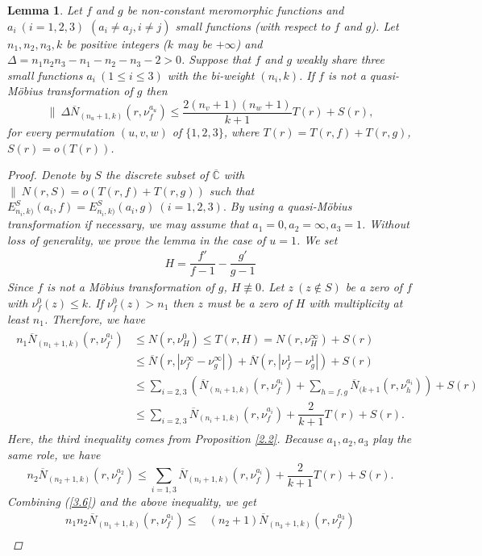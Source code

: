 \documentclass[10pt,a4paper]{amsart}
\newtheorem{lemma}{Lemma}
\newcommand{\C}{{\mathbb{C}}}
\begin{document}
\begin{lemma}\label{2.6}
Let $f$ and $g$ be non-constant meromorphic functions and $a_i\ (i=1,2,3)$ $ (a_i\ne a_j, i\ne j)$ small functions (with respect to $f$ and $g$). Let $n_1,n_2,n_3,k$ be positive integers ($k$ may be $+\infty$) and $\Delta=n_1n_2n_3-n_1-n_2-n_3-2>0$. Suppose that $f$ and $g$ weakly share three small functions $a_i\ (1\le i\le 3)$ with the bi-weight $(n_i,k)$. If $f$ is not a quasi-M\"{o}bius transformation of $g$ then
$$\|\ \Delta\overline N_{(n_u+1,k)}(r,\nu^{a_u}_f)\le \frac{2(n_v+1)(n_w+1)}{k+1}T(r)+S(r),$$
for every permutation $(u,v,w)$ of $\{1,2,3\}$, where $T(r)=T(r,f)+T(r,g)$, $S(r)=o(T(r))$.
\begin{proof}
Denote by $S$ the discrete subset of $\overline\C$ with $\|\ N(r,S)=o(T(r,f)+T(r,g))$ such that $E^S_{n_i,k)}(a_i,f)=E^S_{n_i,k)}(a_i,g)\ (i=1,2,3).$ By using a quasi-M\"{o}bius transformation if necessary, we may assume that $a_1=0,a_2=\infty,a_3=1$. Without loss of generality, we prove the lemma in the case of $u=1$. We set
\begin{align*}
H=\dfrac{f'}{f-1}-\dfrac{g'}{g-1}
\end{align*}
Since $f$ is not a M\"{o}bius transformation of $g$, $H\not\equiv 0$. Let $z\ (z\not\in S)$ be a zero of $f$ with $\nu^0_f(z)\le k$. If $\nu^0_f(z)> n_1$ then $z$ must be a zero of $H$ with multiplicity at least $n_1$. Therefore, we have
\begin{align}\label{3.6}
\begin{split}
n_1\overline N_{(n_1+1,k)}(r,\nu^{a_1}_f)&\le N(r,\nu^0_{H})\le T(r,H)=N(r,\nu^{\infty}_{H})+S(r)\\
&\leq \overline N(r,|\nu^{\infty}_f-\nu^{\infty}_g |)+\overline N(r,|\nu^{1}_f-\nu^{1}_g |)+S(r)\\
&\leq \sum_{i=2,3}(\overline N_{(n_i+1,k)}(r,\nu^{a_i}_{f})+\sum_{h=f,g}\overline N_{(k+1}(r,\nu^{a_i}_{h}))+S(r)\\
&\leq \sum_{i=2,3}\overline N_{(n_i+1,k)}(r,\nu^{a_i}_{f})+\dfrac{2}{k+1}T(r)+S(r).
\end{split}
\end{align}
Here, the third inequality comes from Proposition \ref{2.2}. Because $a_1,a_2,a_3$ play the same role, we have
$$n_2\overline N_{(n_2+1,k)}(r,\nu^{a_2}_f)\leq\sum_{i=1,3} \overline N_{(n_i+1,k)}(r,\nu^{a_i}_{f})+\dfrac{2}{k+1}T(r)+S(r).$$
Combining (\ref{3.6}) and the above inequality, we get
\begin{align*}
n_1n_2\overline N_{(n_1+1,k)}(r,\nu^{a_1}_f)\le&(n_2+1)\overline N_{(n_3+1,k)}(r,\nu^{a_3}_{f})\\

\end{align*}
\end{proof}
\end{lemma}
\end{document}
